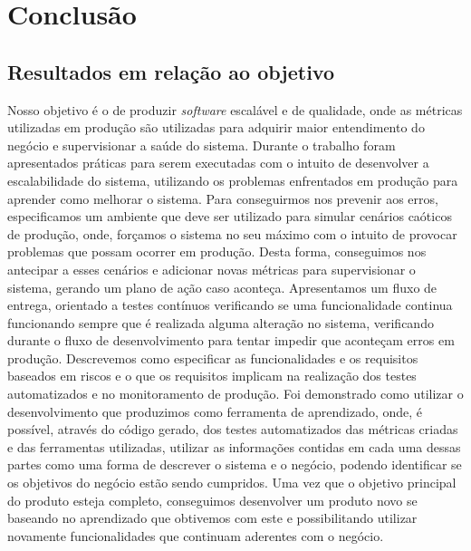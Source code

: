 \chapter{Conclusão}
  \section{Resultados em relação ao objetivo}
    Nosso objetivo é o de produzir \textit{software} escalável e de qualidade,
    onde as métricas utilizadas em produção são utilizadas para adquirir maior
    entendimento do negócio e supervisionar a saúde do sistema. \newline
    Durante o trabalho foram apresentados práticas para serem executadas com o
    intuito de desenvolver a escalabilidade do sistema, utilizando os problemas
    enfrentados em produção para aprender como melhorar o sistema. Para conseguirmos
    nos prevenir aos erros, especificamos um ambiente que deve ser utilizado para
    simular cenários caóticos de produção, onde, forçamos o sistema no seu máximo
    com o intuito de provocar problemas que possam ocorrer em produção. Desta
    forma, conseguimos nos antecipar a esses cenários e adicionar novas métricas
    para supervisionar o sistema, gerando um plano de ação caso
    aconteça. \newline
    Apresentamos um fluxo de entrega, orientado a testes contínuos verificando
    se uma funcionalidade continua funcionando sempre que é realizada alguma
    alteração no sistema, verificando durante o fluxo de desenvolvimento para
    tentar impedir que aconteçam erros em produção. Descrevemos como especificar
    as funcionalidades e os requisitos baseados em riscos e o que os requisitos implicam
    na realização dos testes automatizados e no monitoramento de produção. \newline
    Foi demonstrado como utilizar o desenvolvimento que produzimos como ferramenta de
    aprendizado, onde, é possível, através do código gerado, dos testes automatizados
    das métricas criadas e das ferramentas utilizadas, utilizar as informações
    contidas em cada uma dessas partes como uma forma de descrever o sistema e o
    negócio, podendo identificar se os objetivos do negócio estão sendo cumpridos.
    Uma vez que o objetivo principal do produto esteja completo, conseguimos
    desenvolver um produto novo se baseando no aprendizado que obtivemos com este
    e possibilitando utilizar novamente funcionalidades que continuam aderentes
    com o negócio.

